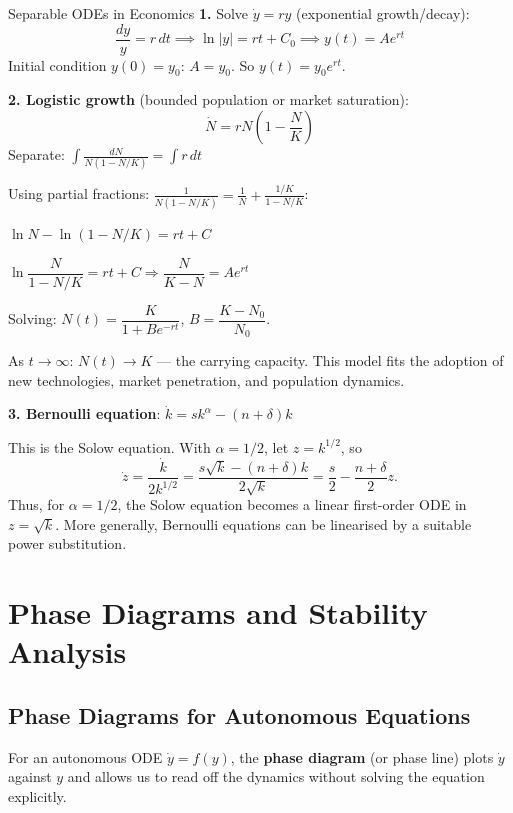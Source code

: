 \documentclass[12pt, a4paper]{article}
\theoremstyle{definition}
\newcommand{\dd}[1]{\,d#1}
\begin{document}
\begin{exbox}{Separable ODEs in Economics}
\textbf{1.} Solve $\dot y = ry$ (exponential growth/decay):
\[
  \frac{dy}{y} = r\dd{t} \implies \ln|y| = rt + C_0 \implies y(t) = Ae^{rt}
\]
Initial condition $y(0)=y_0$: $A=y_0$.  So $y(t) = y_0 e^{rt}$.

\textbf{2. Logistic growth} (bounded population or market saturation):
\[
  \dot N = rN\!\left(1-\frac{N}{K}\right)
\]
Separate: $\displaystyle\int\frac{dN}{N(1-N/K)} = \int r\dd{t}$

Using partial fractions: $\displaystyle\frac{1}{N(1-N/K)} = \frac{1}{N} + \frac{1/K}{1-N/K}$:

$\ln N - \ln(1-N/K) = rt + C$

$\ln\!\dfrac{N}{1-N/K} = rt+C \Rightarrow \dfrac{N}{K-N} = Ae^{rt}$

Solving: $\boxed{N(t) = \dfrac{K}{1 + Be^{-rt}}}$, \;
$B = \dfrac{K-N_0}{N_0}$.

As $t\to\infty$: $N(t)\to K$ --- the carrying capacity.
This model fits the adoption of new technologies, market penetration, and
population dynamics.

\textbf{3. Bernoulli equation}: $\dot k = sk^\alpha - (n+\delta)k$

This is the Solow equation. With $\alpha=1/2$, let $z=k^{1/2}$,
so
\[
  \dot z=\frac{\dot k}{2k^{1/2}}
  =\frac{s\sqrt{k}-(n+\delta)k}{2\sqrt{k}}
  =\frac{s}{2}-\frac{n+\delta}{2}z.
\]
Thus, for $\alpha=1/2$, the Solow equation becomes a linear first-order
ODE in $z=\sqrt{k}$. More generally, Bernoulli equations can be linearised
by a suitable power substitution.
\end{exbox}

\section{Phase Diagrams and Stability Analysis}

\subsection{Phase Diagrams for Autonomous Equations}

For an autonomous ODE $\dot y = f(y)$, the \textbf{phase diagram} (or
phase line) plots $\dot y$ against $y$ and allows us to read off the
dynamics without solving the equation explicitly.
\end{document}
